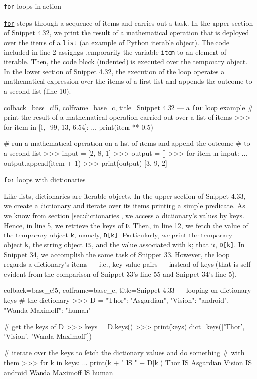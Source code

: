 \documentclass[a4paper,11pt]{book}
\numberwithin{figure}{chapter}
\numberwithin{table}{chapter}
\newcommand{\question}[1]{%
    \begin{tcolorbox}[colback=comp_c!10,colframe=comp_c,sidebyside align=top,width=\linewidth,before skip=1ex]
        #1
    \end{tcolorbox}%
    \switchcolumn%
}
\newcommand{\note}[1]{%
    \begin{tcolorbox}[colback=white!0,colframe=white!10,width=\linewidth,before skip=1ex]
        #1
    \end{tcolorbox}         
}
\begin{document}
\begin{paracol}{2}
	\question{\raggedright \texttt{for} loops in action}
	\note{\href{https://docs.python.org/3/reference/compound_stmts.html#for}{\texttt{for}} steps through a sequence of items and carries out a task. In the upper section of Snippet 4.32, we print the result of a mathematical operation that is deployed over the items of a \texttt{list} (an example of Python iterable object). The code included in line 2 assigngs temporarily the variable \texttt{item} to an element of iterable. Then, the code block (indented) is executed over the temporary object. In the lower section of Snippet 4.32, the execution of the loop operates a mathematical expression over the items of a first list and appends the outcome to a second list (line 10).}
\end{paracol}

\begin{pythoncode}[linenos=true,]{colback=base_c!5, colframe=base_c, title=\sffamily Snippet 4.32 --- a \texttt{for} loop example}
# print the result of a mathematical operation carried out over a list of items
>>> for item in [0, -99, 13, 6.54]:
...     print(item ** 0.5)  

# run a mathematical operation on a list of items and append the outcome 
# to a second list 
>>> input = [2, 8, 1]
>>> output = []
>>> for item in input:
...    output.append(item + 1)
>>> print(output)
[3, 9, 2]
\end{pythoncode}
\clearpage
	
\begin{paracol}{2}
	\question{\raggedright \texttt{for} loops with dictionaries}
	\note{Like lists, dictionaries are iterable objects. In the upper section of Snippet 4.33, we create a dictionary and iterate over its items printing a simple predicate. As we know from section \ref{sec:dictionaries}, we access a dictionary's values by keys. Hence, in line 5, we retrieve the keys of \texttt{D}. Then, in line 12, we fetch the value of the temporary object \texttt{k}, namely, \texttt{D[k]}. Particularly, we print the temporary object \texttt{k}, the string object \texttt{IS}, and the value associated with \texttt{k}; that is, \texttt{D[k]}. In Snippet 34, we accomplish the same task of Snippet 33. However, the loop regards a dictionary's items --- i.e., key-value pairs --- instead of keys (that is self-evident from the comparison of Snippet 33's line 55 and Snippet 34's line 5). }
\end{paracol}

\begin{pythoncode}[linenos=true,]{colback=base_c!5, colframe=base_c, title=\sffamily Snippet 4.33 --- looping on dictionary keys}
# the dictionary
>>> D = {"Thor": "Asgardian", "Vision": "android", "Wanda Maximoff": "human"}

# get the keys of D
>>> keys = D.keys()
>>> print(keys)
dict_keys(['Thor', 'Vision', 'Wanda Maximoff'])

# iterate over the keys to fetch the dictionary values and do something 
# with them
>>> for k in keys:
...     print(k + " IS " + D[k])
Thor IS Asgardian
Vision IS android
Wanda Maximoff IS human
\end{pythoncode}
\end{document}
